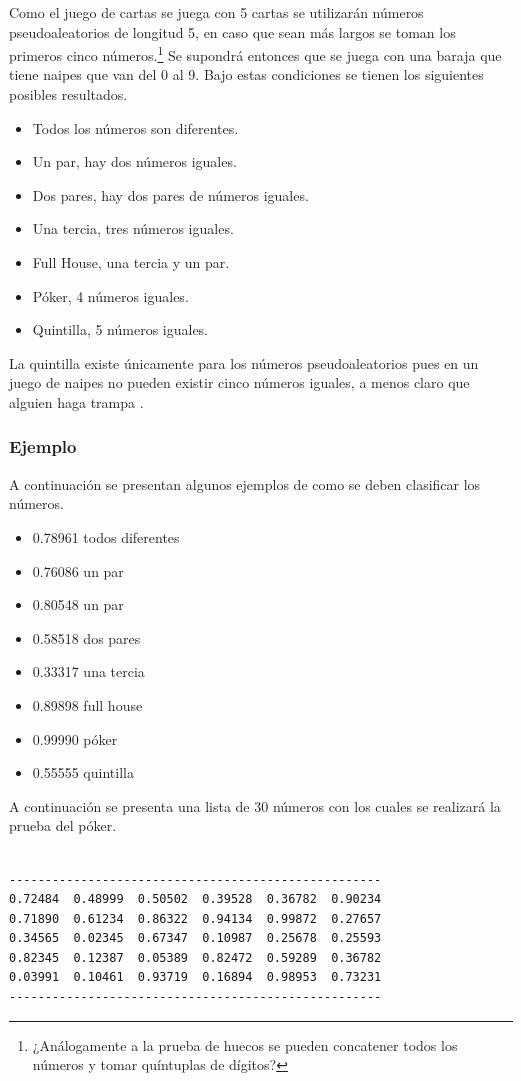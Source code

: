 Como el juego de cartas se juega con 5 cartas se utilizarán números pseudoaleatorios de longitud 5, en caso que sean más largos se toman los primeros cinco números.\footnote{¿Análogamente a la prueba de huecos se pueden concatener todos los números y tomar quíntuplas de dígitos?} Se supondrá entonces que se juega con una baraja que tiene naipes que van del 0 al 9. Bajo estas condiciones se tienen los siguientes posibles resultados.

\begin{itemize}
    \item Todos los números son diferentes.
\item Un par, hay dos números iguales.
\item Dos pares, hay dos pares de números iguales.
\item Una tercia, tres números iguales.
\item Full House, una tercia y un par.
\item Póker, 4 números iguales.
\item Quintilla, 5 números iguales.
\end{itemize}

La quintilla existe únicamente para los números pseudoaleatorios pues en un juego de naipes no pueden existir cinco números iguales, a menos claro que alguien haga trampa \smiley.

\subsubsection{Ejemplo}
A continuación se presentan algunos ejemplos de como se deben clasificar los números.

\begin{itemize}
    \item 0.78961   todos diferentes
\item 0.76086   un par
\item 0.80548   un par
\item 0.58518   dos pares
\item 0.33317   una tercia
\item 0.89898   full house
\item 0.99990   póker
\item 0.55555   quintilla
\end{itemize}

A continuación se presenta una lista de 30 números con los cuales se realizará la prueba del póker.

\begin{verbatim}

----------------------------------------------------
0.72484  0.48999  0.50502  0.39528  0.36782  0.90234
0.71890  0.61234  0.86322  0.94134  0.99872  0.27657
0.34565  0.02345  0.67347  0.10987  0.25678  0.25593
0.82345  0.12387  0.05389  0.82472  0.59289  0.36782
0.03991  0.10461  0.93719  0.16894  0.98953  0.73231
----------------------------------------------------

\end{verbatim}

